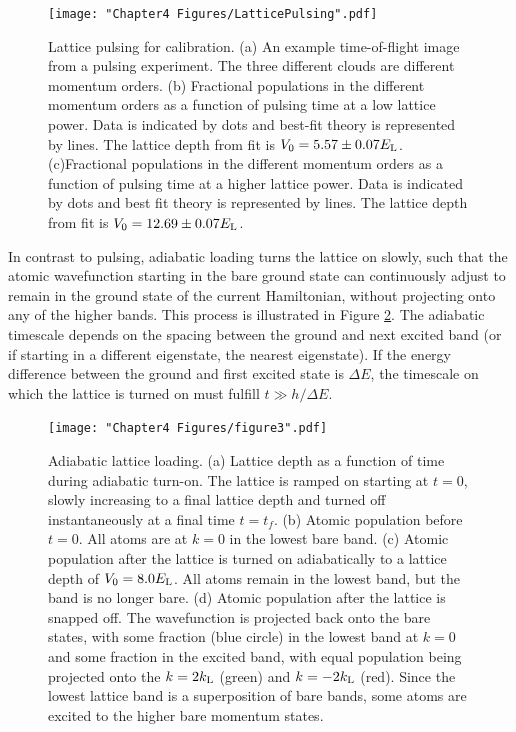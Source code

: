 \begin{figure}
	\texttt{[image: "Chapter4 Figures/LatticePulsing".pdf]}
\caption[Lattice pulsing for calibration]{Lattice pulsing for calibration. (a) An example time-of-flight image from a pulsing experiment. The three different clouds are different momentum orders. (b) Fractional populations in the different momentum orders as a function of pulsing time at a low lattice power. Data is indicated by dots and best-fit theory is represented by lines. The lattice depth from fit is $V_0=5.57\pm0.07 E_{\rm L}$. (c)Fractional populations in the different momentum orders as a function of pulsing time at a higher lattice power. Data is indicated by dots and best fit theory is represented by lines. The lattice depth from fit is $V_0=12.69\pm0.07 E_{\rm L}$. }
\label{fig:latticePulsing}
\end{figure}

In contrast to pulsing, adiabatic loading turns the lattice on slowly, such that the atomic wavefunction starting in the bare ground state can continuously adjust to remain in the ground state of the current Hamiltonian, without projecting onto any of the higher bands. This process is illustrated in Figure \ref{fig:pulsingSchematic}. The adiabatic timescale depends on the spacing between the ground and next excited band (or if starting in a different eigenstate, the nearest eigenstate). If the energy difference between the ground and first excited state is $\Delta E$, the timescale on which the lattice is turned on must fulfill $t \gg h/\Delta E$.  

\begin{figure}
\texttt{[image: "Chapter4 Figures/figure3".pdf]}
\caption[Adiabatic lattice loading]{Adiabatic lattice loading. (a) Lattice depth as a function of time during adiabatic turn-on. The lattice is ramped on starting at $t=0$, slowly increasing to a final lattice depth and turned off instantaneously at a final time $t=t_f$. (b) Atomic population before $t=0$. All atoms are at $k=0$ in the lowest bare band. (c) Atomic population after the lattice is turned on adiabatically to a lattice depth of $V_0 = 8.0 E_{\rm L}$. All atoms remain in the lowest band, but the band is no longer bare. (d) Atomic population after the lattice is snapped off. The wavefunction is projected back onto the bare states, with some fraction (blue circle) in the lowest band at $k=0$ and some fraction in the excited band, with equal population being projected onto the $k = 2 k_{\rm L}$ (green) and $k=-2k_{\rm L}$ (red). Since the lowest lattice band is a superposition of bare bands, some atoms are excited to the higher bare momentum states. }
\label{fig:pulsingSchematic}
\end{figure}


